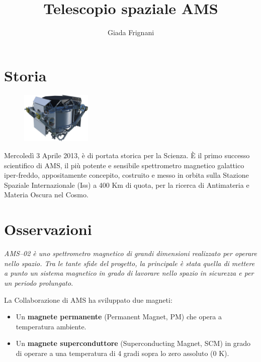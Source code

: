 \documentclass[12pt,a4paper]{article}
\begin{document}
\title{\vspace{-70pt}Telescopio spaziale AMS}
\author{Giada Frignani}
\date{}
\maketitle
\pagestyle{empty}
\thispagestyle{empty}

\section*{Storia}
\label{storia}
\begin{figure}
  \vspace{-10pt}
  \begin{center}
    \includegraphics[width=0.30\textwidth]{satellite}
  \end{center}
  \vspace{-20pt}
\end{figure}
Mercoledì 3 Aprile 2013, è di portata storica per la Scienza. È il primo successo scientifico di AMS, il più potente e sensibile spettrometro magnetico galattico iper-freddo, appositamente concepito, costruito e messo in orbita sulla Stazione Spaziale Internazionale (Iss) a 400 Km di quota, per la ricerca di Antimateria e Materia Oscura nel Cosmo.

\section*{Osservazioni}
\label{osservazioni}

\emph{AMS--02 è uno spettrometro magnetico di grandi dimensioni realizzato per operare nello spazio. Tra le tante sfide del progetto, la principale è stata quella di mettere a punto un sistema magnetico in grado di lavorare nello spazio in sicurezza e per un periodo prolungato}.

La Collaborazione di AMS ha sviluppato due magneti:

\begin{itemize}
\item Un \textbf{magnete permanente} (Permanent Magnet, PM) che opera a temperatura ambiente.

\item Un \textbf{magnete superconduttore} (Superconducting Magnet, SCM) in grado di operare a una temperatura di 4 gradi sopra lo zero assoluto (0 K).

\end{itemize}
\end{document}

